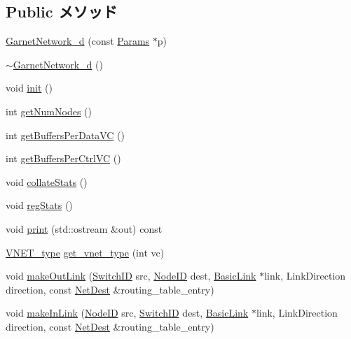 \subsection*{Public メソッド}
\begin{DoxyCompactItemize}
\item 
\hyperlink{classGarnetNetwork__d_aa03daae532d5b6e0e29ca3a1fe3050c2}{GarnetNetwork\_\-d} (const \hyperlink{classGarnetNetwork__d_aa723bef17ce7ec9b7c3ad12002aef3bb}{Params} $\ast$p)
\item 
\hyperlink{classGarnetNetwork__d_a89a93c1928f606aa3eceb0c4104d7b97}{$\sim$GarnetNetwork\_\-d} ()
\item 
void \hyperlink{classGarnetNetwork__d_a02fd73d861ef2e4aabb38c0c9ff82947}{init} ()
\item 
int \hyperlink{classGarnetNetwork__d_a52ab76ba6f0a40a06c6fc4043351824e}{getNumNodes} ()
\item 
int \hyperlink{classGarnetNetwork__d_a5331e3490818aa99a618a3e54b08acc9}{getBuffersPerDataVC} ()
\item 
int \hyperlink{classGarnetNetwork__d_abe1fcc65653425dc91b3e0f9d5957301}{getBuffersPerCtrlVC} ()
\item 
void \hyperlink{classGarnetNetwork__d_a208669cbc0bb1d52565956ca8c690c55}{collateStats} ()
\item 
void \hyperlink{classGarnetNetwork__d_a4dc637449366fcdfc4e764cdf12d9b11}{regStats} ()
\item 
void \hyperlink{classGarnetNetwork__d_ac55fe386a101fbae38c716067c9966a0}{print} (std::ostream \&out) const 
\item 
\hyperlink{NetworkHeader_8hh_a101d399ed954ebfe3619308e600de4d3}{VNET\_\-type} \hyperlink{classGarnetNetwork__d_abbe1c40bc7bb2c9945a382bb3ac61623}{get\_\-vnet\_\-type} (int vc)
\item 
void \hyperlink{classGarnetNetwork__d_a87915d87a2b4c11ae5f0f4da31bd2375}{makeOutLink} (\hyperlink{TypeDefines_8hh_ac925a332c83eaf1e40e056e7a20ebcd8}{SwitchID} src, \hyperlink{TypeDefines_8hh_a83c14b4ae37e80071f6b3506a6c46151}{NodeID} dest, \hyperlink{classBasicLink}{BasicLink} $\ast$link, LinkDirection direction, const \hyperlink{classNetDest}{NetDest} \&routing\_\-table\_\-entry)
\item 
void \hyperlink{classGarnetNetwork__d_ac4cf8ff50e877f26606c24880c73fb9d}{makeInLink} (\hyperlink{TypeDefines_8hh_a83c14b4ae37e80071f6b3506a6c46151}{NodeID} src, \hyperlink{TypeDefines_8hh_ac925a332c83eaf1e40e056e7a20ebcd8}{SwitchID} dest, \hyperlink{classBasicLink}{BasicLink} $\ast$link, LinkDirection direction, const \hyperlink{classNetDest}{NetDest} \&routing\_\-table\_\-entry)

\end{DoxyCompactItemize}
